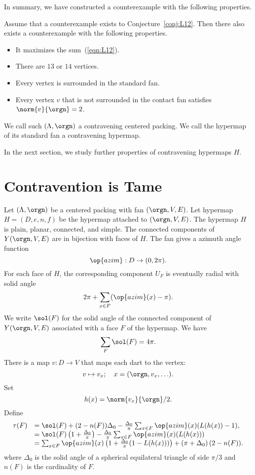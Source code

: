 In summary, we have constructed a counterexample with the following properties.

\begin{lemma}\label{lemma:CE} 
Assume that a counterexample exists to Conjecture~\ref{conj:L12}.  Then there also exists a counterexample with the following properties.
\begin{itemize}
\item It maximizes the sum~(\ref{eqn:L12}).
\item There are $13$ or $14$ vertices.
\item Every vertex is surrounded in the standard fan.
\item Every vertex $v$ that is not surrounded in the contact
fan satisfies $\norm{v}{\orgn}=2$.
\end{itemize}
\end{lemma}





\begin{definition}
We call such $(\Lambda,\orgn)$ a contravening centered packing.  We
call the hypermap of its standard fan a contravening hypermap.
\end{definition}


In the next section, we study further properties of contravening hypermaps $H$.



\section{Contravention is Tame}
    \label{sec:contraproof}

Let $(\Lambda,\orgn)$ be a centered packing with
fan $(\orgn,V,E)$.  Let  hypermap $H=(D,e,n,f)$
be the hypermap attached to $(\orgn,V,E)$.
The hypermap $H$ is plain, planar, connected, and simple.
The connected components of $Y(\orgn,V,E)$ are in bijection with
faces of $H$.  
The fan gives a azimuth angle function
$$
\op{azim} : D \to (0,2\pi).
$$
For each face of $H$, the corresponding component $U_F$
is eventually radial with solid
angle
  $$
  2\pi + \sum_{x\in F} (\op{azim}(x) -\pi).
  $$
We write $\sol(F)$ for the solid angle of the connected component
of $Y(\orgn,V,E)$ associated with a face $F$ of the hypermap.
We have
    $$\sum_{F} \sol(F) = 4\pi.$$
There is a map $v:D\to V$ that maps each dart to the vertex:
$$
v \mapsto v_x; \quad   x = (\orgn,v_x,\ldots).
$$
Set 
$$h(x) = \norm{v_x}{\orgn}/2.$$
Define
\begin{equation}
\begin{array}{lll}
\tau(F) &= \sol(F) + (2- n(F))\Delta_0 - \frac{\Delta_0}{\pi}\sum_{x\in F}\op{azim}(x) (L(h(x)) - 1),\\
  &= \sol(F) \left( 1 + \frac{\Delta_0}{\pi}\right) - \frac{\Delta_0}{\pi} \sum_{x\in F} \op{azim}(x)(L(h(x)))\\
  &=\sum_{x\in F} \op{azim}(x)\left(1 + \frac{\Delta_0}{\pi}(1- L(h(x)))\right) + \left(\pi+{\Delta_0}\right) (2- n(F)).
\end{array}
\end{equation}
where $\Delta_0$ is the solid angle of a spherical equilateral triangle of side $\pi/3$ and $n(F)$ is the cardinality of $F$.

